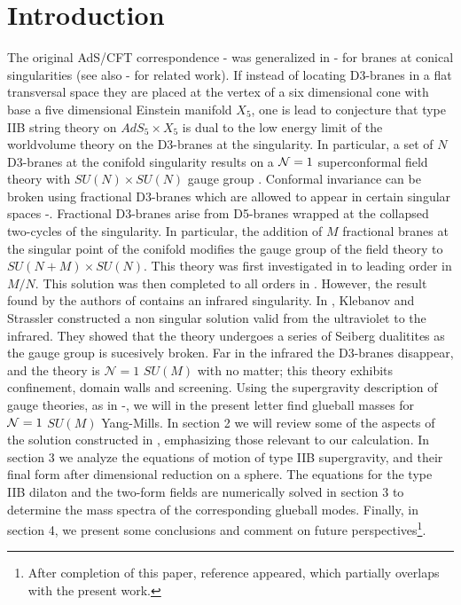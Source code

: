 \documentclass[12pt,epsf,a4paper]{article}
\begin{document}
\newpage




\section{Introduction}

The original AdS/CFT correspondence \cite{ads/cft}-\cite{Witten1} was generalized in 
\cite{Kachru}-\cite{Morrison} for branes at conical singularities (see also 
\cite{Gubser}-\cite{Klebanov:2000me} for related work). If instead 
of locating D3-branes in a flat transversal space they are placed at the vertex of a six 
dimensional cone with base a five dimensional Einstein manifold $X_5$, one is lead 
to conjecture that type IIB string theory on $AdS_5 \times X_5$ is dual to the low 
energy limit of the worldvolume theory on the D3-branes at the singularity. In 
particular, a set of $N$ D3-branes at the conifold singularity results on a 
${\cal N} =1$ superconformal field theory with  $SU(N) \times SU(N)$ gauge group \cite{KW1}. 
Conformal invariance can be broken 
using  fractional D3-branes which are allowed to appear in certain  
singular spaces \cite{Gimon}-\cite{KN}. Fractional D3-branes arise from D5-branes wrapped at 
the collapsed two-cycles of the singularity. In particular, the addition of $M$ fractional 
branes at the singular point of the conifold modifies the gauge group of the field theory to 
$SU(N+M) \times SU(N)$. 
This theory was first investigated in \cite{KN} to leading order in $M/N$. This solution was 
then completed to all orders in \cite{KT}. However, the result found by the authors 
of \cite{KT} contains an infrared singularity. In \cite{KS}, Klebanov and Strassler constructed 
a non singular solution valid from the ultraviolet to the infrared. They showed 
that the theory undergoes a series of Seiberg dualitites as 
the gauge group is sucesively broken. Far in the infrared 
the D3-branes disappear,
and the theory is ${\mathcal N}=1$ $SU(M)$ with no matter; this theory 
exhibits confinement, domain walls and screening. Using the supergravity description 
of gauge theories, as in \cite{Witten-g}-\cite{gb2}, we will 
in the present letter find glueball masses
 for ${\cal N}=1$ $SU(M)$ Yang-Mills. In section 2 we will 
review some of the aspects of the solution constructed in 
\cite{KS}, emphasizing those relevant to our calculation. In section 3 we analyze the 
equations of motion of type IIB supergravity, and their final form after dimensional 
reduction on a sphere. The equations for the type IIB dilaton and the two-form fields 
are numerically solved in section 3 to determine the mass spectra of the corresponding  
glueball modes. Finally, in section 4, we present some conclusions and comment on 
future perspectives\footnote{After completion of this paper, reference \cite{krasnitz} 
appeared, which partially overlaps with the present work.}.
  
\end{document}
